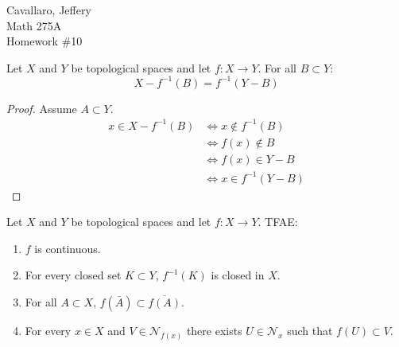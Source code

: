\documentclass[letterpaper,12pt,fleqn]{article}
\renewcommand{\N}{\mathcal{N}}
\begin{document}
Cavallaro, Jeffery \\
Math 275A \\
Homework \#10

\bigskip

\begin{lemma}
  Let \(X\) and \(Y\) be topological spaces and let \(f:X\to Y\).  For all \(B\subset Y\):
  \[X-f^{-1}(B)=f^{-1}(Y-B)\]
\end{lemma}

\begin{proof}
  Assume \(A\subset Y\).
  \begin{align*}
    x\in X-f^{-1}(B) &\iff x\notin f^{-1}(B) \\
    &\iff f(x)\notin B \\
    &\iff f(x)\in Y-B \\
    &\iff x\in f^{-1}(Y-B)
  \end{align*}
\end{proof}

\begin{theorem}[7.1]
  Let \(X\) and \(Y\) be topological spaces and let \(f:X\to Y\).  TFAE:
  \begin{enumerate}
  \item \(f\) is continuous.
  \item For every closed set \(K\subset Y\), \(f^{-1}(K)\) is closed in \(X\).
  \item For all \(A\subset X\), \(f(\bar{A})\subset\overline{f(A)}\).
  \item For every \(x\in X\) and \(V\in\N_{f(x)}\) there exists \(U\in\N_x\) such that \(f(U)\subset V\).
  \end{enumerate}
\end{theorem}
\end{document}
